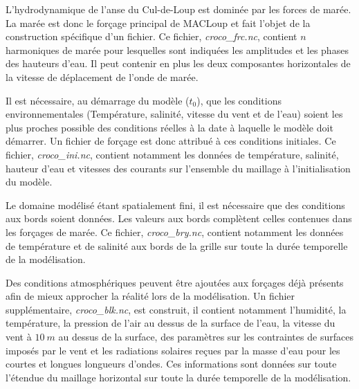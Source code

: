 \documentclass[10pt,a4paper,titlepage]{article}
\begin{document}
L'hydrodynamique de l'anse du Cul-de-Loup est dominée par les forces de marée.
La marée est donc le forçage principal de MACLoup et fait l'objet de la construction spécifique d'un fichier.
Ce fichier, \textit{croco\_frc.nc}, contient $n$ harmoniques de marée pour lesquelles sont indiquées les amplitudes et les phases des hauteurs d'eau. Il peut contenir en plus les deux composantes horizontales de la vitesse de déplacement de l'onde de marée.

Il est nécessaire, au démarrage du modèle ($t_0$), que les conditions environnementales (Température, salinité, vitesse du vent et de l'eau) soient les plus proches possible des conditions réelles à la date à laquelle le modèle doit démarrer.
Un fichier de forçage est donc attribué à ces conditions initiales.
Ce fichier, \textit{croco\_ini.nc}, contient notamment les données de température, salinité, hauteur d'eau et vitesses des courants sur l'ensemble du maillage à l'initialisation du modèle.

Le domaine modélisé étant spatialement fini, il est nécessaire que des conditions aux bords soient données.
Les valeurs aux bords complètent celles contenues dans les forçages de marée.
Ce fichier, \textit{croco\_bry.nc}, contient notamment les données de température et de salinité %
aux bords de la grille sur toute la durée temporelle de la modélisation.


Des conditions atmosphériques peuvent être ajoutées aux forçages déjà présents afin de mieux approcher la réalité lors de la modélisation.
Un fichier supplémentaire, \textit{croco\_blk.nc}, est construit, il contient notamment l'humidité, la température, la pression de l'air au dessus de la surface de l'eau, la vitesse du vent à $10~m$ au dessus de la surface, des paramètres sur les contraintes de surfaces imposés par le vent et les radiations solaires reçues par la masse d'eau pour les courtes et longues longueurs d'ondes.
Ces informations sont données sur toute l'étendue du maillage horizontal sur toute la durée temporelle de la modélisation.
\end{document}
